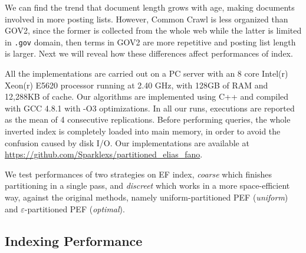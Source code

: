 \documentclass[runningheads,a4paper]{llncs}
\begin{document}
We can find the trend that document length grows with age, making documents involved in more posting lists.
However, Common Crawl is less organized than GOV2, since the former is collected from the whole web while the latter is limited in \texttt{.gov} domain, then terms in GOV2 are more repetitive and posting list length is larger.
Next we will reveal how these differences affect performances of index.

All the implementations are carried out on a PC server with an 8 core Intel(r) Xeon(r) E5620 processor running at 2.40 GHz, with 128GB of RAM and 12,288KB of cache. Our algorithms are implemented using C++ and compiled with GCC 4.8.1 with -O3 optimizations. In all our runs, executions are reported as the mean of 4 consecutive replications.
Before performing queries, the whole inverted index is completely loaded into main memory, in order to avoid the confusion caused by disk I/O.
Our implementations are available at \url{https://github.com/Sparklexs/partitioned_elias_fano}.

We test performances of two strategies on EF index, \textit{coarse} which finishes partitioning in a single pass, and \textit{discreet} which works in a more space-efficient way, against the original methods, namely uniform-partitioned PEF (\textit{uniform}) and $\varepsilon$-partitioned PEF (\textit{optimal}).

\subsection{Indexing Performance}
\end{document}
